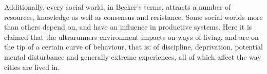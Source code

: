 Additionally, every social world, in Becker’s terms, attracts a number
of resources, knowledge as well as consensus and resistance. Some social worlds
more than others depend on, and have an influence in
productive systems. Here it is claimed that the ultrarunners environment impacts 
on ways of living, and are on the tip of a certain curve of behaviour, that
is: of discipline, deprivation, potential mental disturbance and generally extreme
experiences, all of which affect the way cities are lived in.



